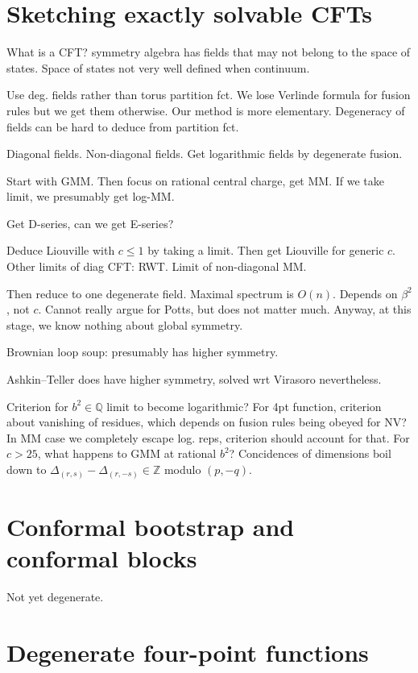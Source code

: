 \documentclass[12pt, a4paper]{article}
\theoremstyle{break}
\begin{document}
\section{Sketching exactly solvable CFTs}

What is a CFT? symmetry algebra has fields that may not belong to the space of states. Space of states not very well defined when continuum. 


Use deg. fields rather than torus partition fct. We lose Verlinde formula for fusion rules but we get them otherwise. Our method is more elementary. Degeneracy of fields can be hard to deduce from partition fct. 

Diagonal fields. Non-diagonal fields. Get logarithmic fields by degenerate fusion.

Start with GMM. Then focus on rational central charge, get MM. If we take limit, we presumably get log-MM. 

Get D-series, can we get E-series? 

Deduce Liouville with $c\leq 1$ by taking a limit. Then get Liouville for generic $c$. Other limits of diag CFT: RWT. Limit of non-diagonal MM.

Then reduce to one degenerate field. Maximal spectrum is $O(n)$. Depends on $\beta^2$, not $c$. Cannot really argue for Potts, but does not matter much. Anyway, at this stage, we know nothing about global symmetry.

Brownian loop soup: presumably has higher symmetry.

Ashkin--Teller does have higher symmetry, solved wrt Virasoro nevertheless.

Criterion for $b^2\in\mathbb{Q}$ limit to become logarithmic? For 4pt function, criterion about vanishing of residues, which depends on fusion rules being obeyed for NV? In MM case we completely escape log. reps, criterion should account for that.  
For $c>25$, what happens to GMM at rational $b^2$? Concidences of dimensions boil down to $\Delta_{(r,s)}-\Delta_{(r,-s)} \in \mathbb{Z}$ modulo $(p, -q)$. 

\section{Conformal bootstrap and conformal blocks}

Not yet degenerate. 

\section{Degenerate four-point functions}
\end{document}
